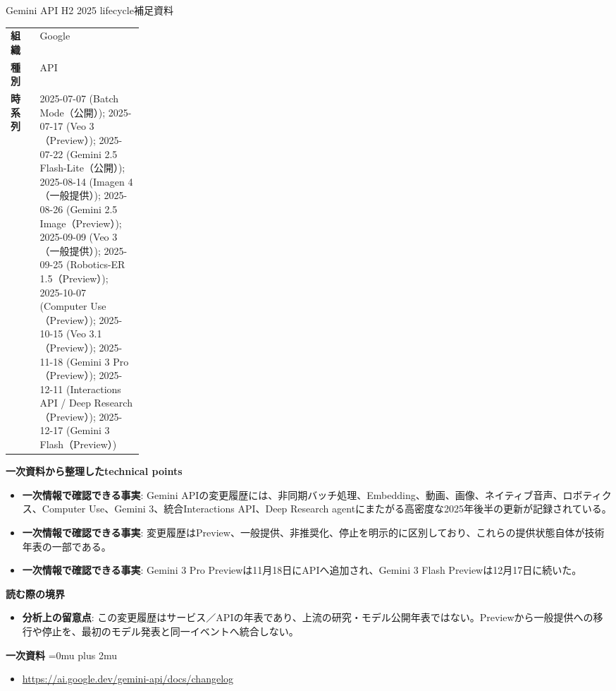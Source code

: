 \begin{technicalnote}{Gemini API H2 2025 lifecycle}{補足資料}
\begingroup
\begin{tabularx}{\linewidth}{@{}>{\bfseries}p{0.22\linewidth}X@{}}
組織 & Google \\
種別 & API \\
時系列 & 2025-07-07 (Batch Mode（公開）); 2025-07-17 (Veo 3（Preview）); 2025-07-22 (Gemini 2.5 Flash-Lite（公開）); 2025-08-14 (Imagen 4（一般提供）); 2025-08-26 (Gemini 2.5 Image（Preview）); 2025-09-09 (Veo 3（一般提供）); 2025-09-25 (Robotics-ER 1.5（Preview）); 2025-10-07 (Computer Use（Preview）); 2025-10-15 (Veo 3.1（Preview）); 2025-11-18 (Gemini 3 Pro（Preview）); 2025-12-11 (Interactions API / Deep Research（Preview）); 2025-12-17 (Gemini 3 Flash（Preview）) \\
\end{tabularx}
\smallskip
{\bfseries 一次資料から整理したtechnical points}
\begin{itemize}[leftmargin=1.5em,itemsep=0.35em]
\item \textbf{一次情報で確認できる事実}: Gemini APIの変更履歴には、非同期バッチ処理、Embedding、動画、画像、ネイティブ音声、ロボティクス、Computer Use、Gemini 3、統合Interactions API、Deep Research agentにまたがる高密度な2025年後半の更新が記録されている。
\item \textbf{一次情報で確認できる事実}: 変更履歴はPreview、一般提供、非推奨化、停止を明示的に区別しており、これらの提供状態自体が技術年表の一部である。
\item \textbf{一次情報で確認できる事実}: Gemini 3 Pro Previewは11月18日にAPIへ追加され、Gemini 3 Flash Previewは12月17日に続いた。
\end{itemize}
\begin{minipage}{\linewidth}
{\bfseries 読む際の境界}
\begin{itemize}[leftmargin=1.5em,itemsep=0.35em]
\item \textbf{分析上の留意点}: この変更履歴はサービス／APIの年表であり、上流の研究・モデル公開年表ではない。Previewから一般提供への移行や停止を、最初のモデル発表と同一イベントへ統合しない。
\end{itemize}
\begin{samepage}
{\bfseries 一次資料}
\begingroup\sloppy
\Urlmuskip=0mu plus 2mu\relax
\begin{itemize}[leftmargin=1.5em,itemsep=0.25em]
\item {\scriptsize\url{https://ai.google.dev/gemini-api/docs/changelog}}
\end{itemize}
\endgroup
\end{samepage}
\end{minipage}
\endgroup
\end{technicalnote}
\medskip

